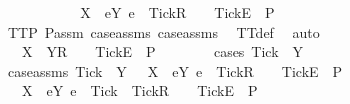 \begin{isabellebody}
\ \ \ \ \ \ \isamarkupfalse%
\ \isamarkupfalse%
\ {\isachardoublequoteopen}{\isasymrho}\ {\isacharat}\ {\isacharbrackleft}X\ {\isasymunion}\ {\isacharbraceleft}e{\isasymin}Y{\isachardot}\ e\ {\isasymnoteq}\ Tick{\isacharbraceright}{\isacharbrackright}\isactrlsub R\ {\isacharhash}\ {\isasymsigma}{}\ {\isacharat}\ {\isacharbrackleft}{\isacharbrackleft}Tick{\isacharbrackright}\isactrlsub E{\isacharbrackright}\ {\isasymin}\ P{\isachardoublequoteclose}\isanewline
\ \ \ \ \ \ \ \ \isamarkupfalse%
\ TT{}{\isacharunderscore}P\ P{\isacharunderscore}assm{}\ case{\isacharunderscore}assms\ case{\isacharunderscore}assms{}\ \isamarkupfalse%
\ TT{}{\isacharunderscore}def\ \isamarkupfalse%
\ auto\isanewline
\ \ \ \ \ \ \isamarkupfalse%
\ \isamarkupfalse%
\ {\isachardoublequoteopen}{\isasymrho}\ {\isacharat}\ {\isacharbrackleft}X\ {\isasymunion}\ Y{\isacharbrackright}\isactrlsub R\ {\isacharhash}\ {\isasymsigma}{}\ {\isacharat}\ {\isacharbrackleft}{\isacharbrackleft}Tick{\isacharbrackright}\isactrlsub E{\isacharbrackright}\ {\isasymin}\ P{\isachardoublequoteclose}\isanewline
\ \ \ \ \ \ \isamarkupfalse%
\ {\isacharparenleft}cases\ {\isachardoublequoteopen}Tick\ {\isasymin}\ Y{\isachardoublequoteclose}{\isacharparenright}\isanewline
\ \ \ \ \ \ \ \ \isamarkupfalse%
\ case{\isacharunderscore}assms{}{\isacharcolon}\ {\isachardoublequoteopen}Tick\ {\isasymin}\ Y{\isachardoublequoteclose}\ {\isachardoublequoteopen}{\isasymrho}\ {\isacharat}\ {\isacharbrackleft}X\ {\isasymunion}\ {\isacharbraceleft}e{\isasymin}Y{\isachardot}\ e\ {\isasymnoteq}\ Tick{\isacharbraceright}{\isacharbrackright}\isactrlsub R\ {\isacharhash}\ {\isasymsigma}{}\ {\isacharat}\ {\isacharbrackleft}{\isacharbrackleft}Tick{\isacharbrackright}\isactrlsub E{\isacharbrackright}\ {\isasymin}\ P{\isachardoublequoteclose}\isanewline
\ \ \ \ \ \ \ \ \isamarkupfalse%
\ \isamarkupfalse%
\ {\isachardoublequoteopen}{\isasymrho}\ {\isacharat}\ {\isacharbrackleft}X\ {\isasymunion}\ {\isacharbraceleft}e{\isasymin}Y{\isachardot}\ e\ {\isasymnoteq}\ Tick{\isacharbraceright}\ {\isasymunion}\ {\isacharbraceleft}Tick{\isacharbraceright}{\isacharbrackright}\isactrlsub R\ {\isacharhash}\ {\isasymsigma}{}\ {\isacharat}\ {\isacharbrackleft}{\isacharbrackleft}Tick{\isacharbrackright}\isactrlsub E{\isacharbrackright}\ {\isasymin}\ P{\isachardoublequoteclose}\isanewline

\end{isabellebody}
